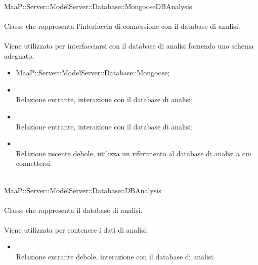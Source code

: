 \\
MaaP::Server::ModelServer::Database::MongooseDBAnalysis\\
\\
Classe che rappresenta l'interfaccia di connessione con il database di analisi.\\
\\
Viene utilizzata per interfacciarsi con il database di analisi fornendo uno schema adeguato.\\
\begin{itemize}
\item MaaP::Server::ModelServer::Database::Mongoose;
\end{itemize}
\begin{itemize}
\item{}\\
Relazione entrante, interazione con il database di analisi;
\item{}\\
Relazione entrante, interazione con il database di analisi;
\item{}\\
Relazione uscente debole, utilizza un riferimento al database di analisi a cui connettersi.
\end{itemize}

\\
MaaP::Server::ModelServer::Database::DBAnalysis\\
\\
Classe che rappresenta il database di analisi.\\
\\
Viene utilizzata per contenere i dati di analisi.\\
\begin{itemize}
\item{}\\
Relazione entrante debole, interazione con il database di analisi.
\end{itemize}

